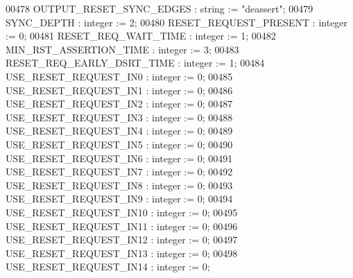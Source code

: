 \begin{DoxyCode}
00478             OUTPUT\_RESET\_SYNC\_EDGES   : \textcolor{comment}{string}  := \textcolor{keyword}{"deassert"};
00479             SYNC\_DEPTH                : \textcolor{comment}{integer} := \textcolor{vhdllogic}{}\textcolor{vhdllogic}{2};
00480             RESET\_REQUEST\_PRESENT     : \textcolor{comment}{integer} := \textcolor{vhdllogic}{}\textcolor{vhdllogic}{0};
00481             RESET\_REQ\_WAIT\_TIME       : \textcolor{comment}{integer} := \textcolor{vhdllogic}{}\textcolor{vhdllogic}{1};
00482             MIN\_RST\_ASSERTION\_TIME    : \textcolor{comment}{integer} := \textcolor{vhdllogic}{}\textcolor{vhdllogic}{3};
00483             RESET\_REQ\_EARLY\_DSRT\_TIME : \textcolor{comment}{integer} := \textcolor{vhdllogic}{}\textcolor{vhdllogic}{1};
00484             USE\_RESET\_REQUEST\_IN0     : \textcolor{comment}{integer} := \textcolor{vhdllogic}{}\textcolor{vhdllogic}{0};
00485             USE\_RESET\_REQUEST\_IN1     : \textcolor{comment}{integer} := \textcolor{vhdllogic}{}\textcolor{vhdllogic}{0};
00486             USE\_RESET\_REQUEST\_IN2     : \textcolor{comment}{integer} := \textcolor{vhdllogic}{}\textcolor{vhdllogic}{0};
00487             USE\_RESET\_REQUEST\_IN3     : \textcolor{comment}{integer} := \textcolor{vhdllogic}{}\textcolor{vhdllogic}{0};
00488             USE\_RESET\_REQUEST\_IN4     : \textcolor{comment}{integer} := \textcolor{vhdllogic}{}\textcolor{vhdllogic}{0};
00489             USE\_RESET\_REQUEST\_IN5     : \textcolor{comment}{integer} := \textcolor{vhdllogic}{}\textcolor{vhdllogic}{0};
00490             USE\_RESET\_REQUEST\_IN6     : \textcolor{comment}{integer} := \textcolor{vhdllogic}{}\textcolor{vhdllogic}{0};
00491             USE\_RESET\_REQUEST\_IN7     : \textcolor{comment}{integer} := \textcolor{vhdllogic}{}\textcolor{vhdllogic}{0};
00492             USE\_RESET\_REQUEST\_IN8     : \textcolor{comment}{integer} := \textcolor{vhdllogic}{}\textcolor{vhdllogic}{0};
00493             USE\_RESET\_REQUEST\_IN9     : \textcolor{comment}{integer} := \textcolor{vhdllogic}{}\textcolor{vhdllogic}{0};
00494             USE\_RESET\_REQUEST\_IN10    : \textcolor{comment}{integer} := \textcolor{vhdllogic}{}\textcolor{vhdllogic}{0};
00495             USE\_RESET\_REQUEST\_IN11    : \textcolor{comment}{integer} := \textcolor{vhdllogic}{}\textcolor{vhdllogic}{0};
00496             USE\_RESET\_REQUEST\_IN12    : \textcolor{comment}{integer} := \textcolor{vhdllogic}{}\textcolor{vhdllogic}{0};
00497             USE\_RESET\_REQUEST\_IN13    : \textcolor{comment}{integer} := \textcolor{vhdllogic}{}\textcolor{vhdllogic}{0};
00498             USE\_RESET\_REQUEST\_IN14    : \textcolor{comment}{integer} := \textcolor{vhdllogic}{}\textcolor{vhdllogic}{0};

\end{DoxyCode}
